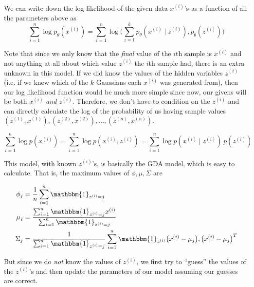 \documentclass{article}
\begin{document}
  We can write down the log-likelihood of the given data $x^{(i)}$'s as a function of all the parameters above as
  \begin{equation}
    \sum_{i=1}^n \log p_\theta (x^{(i)}) = \sum_{i=1}^n \log \bigg( \sum_{z=1}^k  p_\theta ( x^{(i)} \mid z^{(i)} ) , p_\theta ( z^{(i)} ) \bigg)
  \end{equation}

  \begin{example}
    \label{ex:dual-nature-of-latents-and-parameters}
    Note that since we only know that the \textit{final} value of the $i$th sample is $x^{(i)}$ and not anything at all about which value $z^{(i)}$ the $i$th sample had, there is an extra unknown in this model. If we did know the values of the hidden variables $z^{(i)}$ (i.e. if we knew which of the $k$ Gaussians each $x^{(i)}$ was generated from), then our log likelihood function would be much more simple since now, our givens will be both $x^{(i)}$ \textit{and} $z^{(i)}$. Therefore, we don't have to condition on the $z^{(i)}$ and can directly calculate the log of the probability of us having sample values $(z^{(1)}, x^{(1)}), (z^{(2)}, x^{(2)}), \ldots, (z^{(n)}, x^{(n)})$.

    \begin{equation}
      \sum_{i=1}^n \log p(x^{(i)}) = \sum_{i=1}^n \log p( x^{(i)}, z^{(i)}) = \sum_{i=1}^n \log p( x^{(i)} \mid z^{(i)}) \, p(z^{(i)})
    \end{equation}

    This model, with known $z^{(i)}$'s, is basically the GDA model, which is easy to calculate. That is, the maximum values of $\phi, \mu, \Sigma$ are

    \begin{align*}
      \phi_j & = \frac{1}{n} \sum_{i=1}^n \mathbbm{1}_{z^{(i)} = j} \\
      \mu_j & = \frac{\sum_{i=1}^n \mathbbm{1}_{z^{(i)} = j} x^{(i)}}{\sum_{i=1}^n \mathbbm{1}_{z^{(i)} = j}} \\
      \Sigma_j & = \frac{1}{\sum_{i=1}^n \mathbbm{1}_{z^{(i)} = j}} \sum_{i=1}^n \mathbbm{1}_{z^{(i)}} \big( x^{(i)} - \mu_j \big),\big(x^{(i)} - \mu_j \big)^T
    \end{align*}
  \end{example}

  But since we do \textit{not} know the values of $z^{(i)}$, we first try to ``guess'' the values of the $z^{(i)}$'s and then update the parameters of our model assuming our guesses are correct. 
\end{document}
